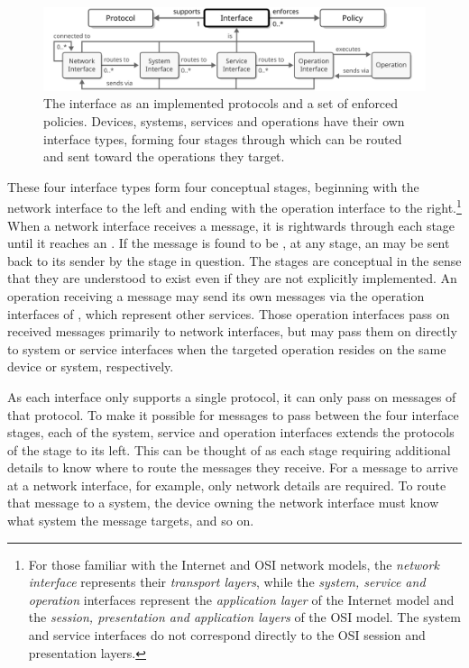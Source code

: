 \begin{figure}[ht!]
  \centering
  \includegraphics[scale=0.9]{figures/interface}
  \caption{
    The interface as an implemented protocols and a set of enforced policies.
    Devices, systems, services and operations have their own interface types, forming four stages through which  can be routed and  sent toward the operations they target.
  }
  \label{fig:interface}
\end{figure}

These four interface types form four conceptual stages, beginning with the network interface to the left and ending with the operation interface to the right.\footnote{
  For those familiar with the Internet \cite{rfc1122} and OSI \cite{iso7498_1} network models, the \textit{network interface} represents their \textit{transport layers}, while the \textit{system, service and operation} interfaces represent the \textit{application layer} of the Internet model and the \textit{session, presentation and application layers} of the OSI model.
  The system and service interfaces do not correspond directly to the OSI session and presentation layers.
}
When a network interface receives a message, it is  rightwards through each stage until it reaches an .
If the message is found to be ,  at any stage, an  may be sent back to its sender by the stage in question.
The stages are conceptual in the sense that they are understood to exist even if they are not explicitly implemented.
An operation receiving a message may send its own messages via the operation interfaces of , which represent other services.
Those operation interfaces pass on received messages primarily to network interfaces, but may pass them on directly to system or service interfaces when the targeted operation resides on the same device or system, respectively.

As each interface only supports a single protocol, it can only pass on messages of that protocol.
To make it possible for messages to pass between the four interface stages, each of the system, service and operation interfaces extends the protocols of the stage to its left.
This can be thought of as each stage requiring additional details to know where to route the messages they receive.
For a message to arrive at a network interface, for example, only network details are required.
To route that message to a system, the device owning the network interface must know what system the message targets, and so on.

